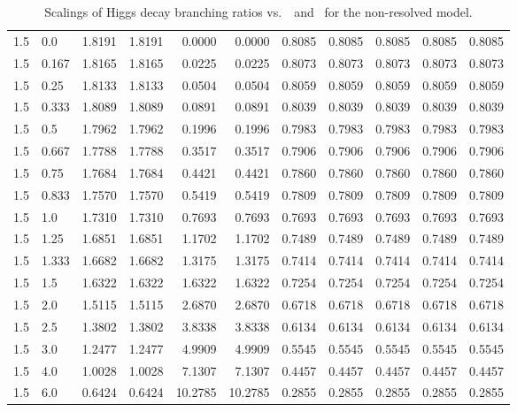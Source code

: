 \begin{table}[h!]
\begin{tabular}{ll rrrrrrrrr}
   1.5  & 0.0    & 1.8191 & 1.8191 & 0.0000  & 0.0000  & 0.8085 & 0.8085 & 0.8085 & 0.8085 & 0.8085 \\
   1.5  & 0.167  & 1.8165 & 1.8165 & 0.0225  & 0.0225  & 0.8073 & 0.8073 & 0.8073 & 0.8073 & 0.8073 \\
   1.5  & 0.25   & 1.8133 & 1.8133 & 0.0504  & 0.0504  & 0.8059 & 0.8059 & 0.8059 & 0.8059 & 0.8059 \\
   1.5  & 0.333  & 1.8089 & 1.8089 & 0.0891  & 0.0891  & 0.8039 & 0.8039 & 0.8039 & 0.8039 & 0.8039 \\
   1.5  & 0.5    & 1.7962 & 1.7962 & 0.1996  & 0.1996  & 0.7983 & 0.7983 & 0.7983 & 0.7983 & 0.7983 \\
   1.5  & 0.667  & 1.7788 & 1.7788 & 0.3517  & 0.3517  & 0.7906 & 0.7906 & 0.7906 & 0.7906 & 0.7906 \\
   1.5  & 0.75   & 1.7684 & 1.7684 & 0.4421  & 0.4421  & 0.7860 & 0.7860 & 0.7860 & 0.7860 & 0.7860 \\
   1.5  & 0.833  & 1.7570 & 1.7570 & 0.5419  & 0.5419  & 0.7809 & 0.7809 & 0.7809 & 0.7809 & 0.7809 \\
   1.5  & 1.0    & 1.7310 & 1.7310 & 0.7693  & 0.7693  & 0.7693 & 0.7693 & 0.7693 & 0.7693 & 0.7693 \\
   1.5  & 1.25   & 1.6851 & 1.6851 & 1.1702  & 1.1702  & 0.7489 & 0.7489 & 0.7489 & 0.7489 & 0.7489 \\
   1.5  & 1.333  & 1.6682 & 1.6682 & 1.3175  & 1.3175  & 0.7414 & 0.7414 & 0.7414 & 0.7414 & 0.7414 \\
   1.5  & 1.5    & 1.6322 & 1.6322 & 1.6322  & 1.6322  & 0.7254 & 0.7254 & 0.7254 & 0.7254 & 0.7254 \\
   1.5  & 2.0    & 1.5115 & 1.5115 & 2.6870  & 2.6870  & 0.6718 & 0.6718 & 0.6718 & 0.6718 & 0.6718 \\
   1.5  & 2.5    & 1.3802 & 1.3802 & 3.8338  & 3.8338  & 0.6134 & 0.6134 & 0.6134 & 0.6134 & 0.6134 \\
   1.5  & 3.0    & 1.2477 & 1.2477 & 4.9909  & 4.9909  & 0.5545 & 0.5545 & 0.5545 & 0.5545 & 0.5545 \\
   1.5  & 4.0    & 1.0028 & 1.0028 & 7.1307  & 7.1307  & 0.4457 & 0.4457 & 0.4457 & 0.4457 & 0.4457 \\
   1.5  & 6.0    & 0.6424 & 0.6424 & 10.2785 & 10.2785 & 0.2855 & 0.2855 & 0.2855 & 0.2855 & 0.2855 \\\hline
    \end{tabular}
    \caption[Scalings of Higgs decay branching ratios vs.\ \Ct\ and ]{Scalings of Higgs decay branching ratios vs.\ \Ct\ and \ for the non-resolved model.}\label{tab:brscalingK6_1p5}
 \end{table}
